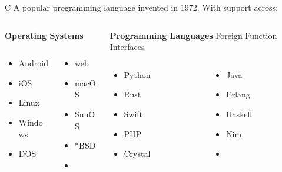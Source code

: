 \documentclass[aspectratio=169,xcolor=dvipsnames]{beamer}
\begin{document}
\begin{frame}{C}
	A popular programming language invented in 1972. With support across:
	\begin{columns}[t]
		\begin{column}[T]{0.4\textwidth}
			\textbf{Operating Systems}
			\vspace{1em}
			\begin{columns}[t]
				\begin{column}[T]{0.416\textwidth}
					\begin{itemize}
						\item Android
						\item iOS
						\item Linux
						\item Windows
						\item DOS
					\end{itemize}
				\end{column}
				\begin{column}[T]{0.4\textwidth}
					\begin{itemize}
						\item web
						\item macOS
						\item SunOS
						\item *BSD
						\item \textellipsis{}
					\end{itemize}
				\end{column}
			\end{columns}
		\end{column}
		\begin{column}[T]{0.4\textwidth}
			\textbf{Programming Languages}
			Foreign Function Interfaces
			\begin{columns}[t]
				\begin{column}[T]{0.4\textwidth}
					\begin{itemize}
						\item Python
						\item Rust
						\item Swift
						\item PHP
						\item Crystal
					\end{itemize}
				\end{column}
				\begin{column}[T]{0.4\textwidth}
					\begin{itemize}
						\item Java
						\item Erlang
						\item Haskell
						\item Nim
						\item \textellipsis{}
					\end{itemize}
				\end{column}
			\end{columns}
		\end{column}
	\end{columns}
\end{frame}
\end{document}
